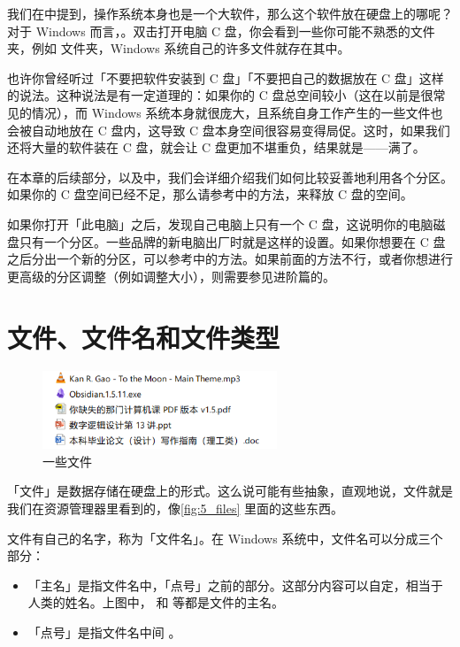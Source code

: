 我们在中提到，操作系统本身也是一个大软件，那么这个软件放在硬盘上的哪呢？对于 Windows 而言，。双击打开电脑 C 盘，你会看到一些你可能不熟悉的文件夹，例如  文件夹，Windows 系统自己的许多文件就存在其中。

也许你曾经听过「不要把软件安装到 C 盘」「不要把自己的数据放在 C 盘」这样的说法。这种说法是有一定道理的：如果你的 C 盘总空间较小（这在以前是很常见的情况），而 Windows 系统本身就很庞大，且系统自身工作产生的一些文件也会被自动地放在 C 盘内，这导致 C 盘本身空间很容易变得局促。这时，如果我们还将大量的软件装在 C 盘，就会让 C 盘更加不堪重负，结果就是——满了。

在本章的后续部分，以及中，我们会详细介绍我们如何比较妥善地利用各个分区。如果你的 C 盘空间已经不足，那么请参考中的方法，来释放 C 盘的空间。

\begin{note}
  如果你打开「此电脑」之后，发现自己电脑上只有一个 C 盘，这说明你的电脑磁盘只有一个分区。一些品牌的新电脑出厂时就是这样的设置。如果你想要在 C 盘之后分出一个新的分区，可以参考中的方法。如果前面的方法不行，或者你想进行更高级的分区调整（例如调整大小），则需要参见进阶篇的。
\end{note}

\section{文件、文件名和文件类型}

\begin{figure}
  \centering
  \includegraphics[width=7cm]{assets/basic/5_files.png}
  \caption{一些文件}
  \label{fig:5_files}
\end{figure}

「文件」是数据存储在硬盘上的形式。这么说可能有些抽象，直观地说，文件就是我们在资源管理器里看到的，像\autoref{fig:5_files} 里面的这些东西。

文件有自己的名字，称为「文件名」。在 Windows 系统中，文件名可以分成三个部分：

\begin{itemize}
  \item 「主名」是指文件名中，「点号」之前的部分。这部分内容可以自定，相当于人类的姓名。上图中， 和  等都是文件的主名。
  \item 「点号」是指文件名中间 。
\end{itemize}

